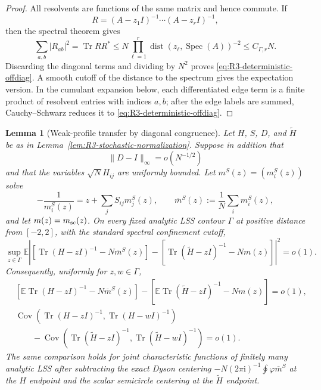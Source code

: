 \documentclass[11pt]{article}
\newtheorem{lemma}[theorem]{Lemma}
\theoremstyle{definition}
\theoremstyle{remark}
\newcommand{\E}{\mathbb E}
\newcommand{\Cov}{\operatorname{Cov}}
\newcommand{\Tr}{\operatorname{Tr}}
\newcommand{\spec}{\operatorname{Spec}}
\newcommand{\ii}{\mathrm i}
\newcommand{\norm}[1]{\lVert #1\rVert}
\begin{document}
\begin{proof}
All resolvents are functions of the same matrix and hence commute.  If
\[
 R=(A-z_1I)^{-1}\cdots(A-z_rI)^{-1},
\]
then the spectral theorem gives
\[
 \sum_{a,b}|R_{ab}|^2=\Tr RR^*
 \le N\prod_{\ell=1}^r
 \operatorname{dist}(z_\ell,\spec(A))^{-2}
 \le C_{\Gamma,r}N.
\]
Discarding the diagonal terms and dividing by \(N^2\) proves
\eqref{eq:R3-deterministic-offdiag}.  A smooth cutoff of the distance to the
spectrum gives the expectation version.  In the cumulant expansion below,
each differentiated edge term is a finite product of resolvent entries with
indices \(a,b\); after the edge labels are summed, Cauchy--Schwarz reduces it
to \eqref{eq:R3-deterministic-offdiag}.
\end{proof}

\begin{lemma}[Weak-profile transfer by diagonal congruence]
\label{lem:R3-profile-interpolation}
Let \(H\), \(S\), \(D\), and \(\widetilde H\) be as in
Lemma~\ref{lem:R3-stochastic-normalization}.  Suppose in addition that
\begin{equation}\label{eq:R3-congruence-rate}
 \norm{D-I}_\infty=o(N^{-1/2})
\end{equation}
and that the variables \(\sqrt N H_{ij}\) are uniformly bounded.  Let
\(m^S(z)=(m_i^S(z))\) solve
\begin{equation}\label{eq:R3-congruence-QVE}
 -\frac1{m_i^S(z)}=z+\sum_jS_{ij}m_j^S(z),
 \qquad
 \overline m^S(z):=\frac1N\sum_i m_i^S(z),
\end{equation}
and let \(m(z)=m_{\rm sc}(z)\).  On every fixed analytic LSS contour
\(\Gamma\) at positive distance from \([-2,2]\), with the standard spectral
confinement cutoff,
\begin{equation}\label{eq:R3-congruence-L2}
 \sup_{z\in\Gamma}\E\left|
 \left[\Tr(H-zI)^{-1}-N\overline m^S(z)\right]
 -\left[\Tr(\widetilde H-zI)^{-1}-Nm(z)\right]
 \right|^2=o(1).
\end{equation}
Consequently, uniformly for \(z,w\in\Gamma\),
\begin{align}
 &\left[\E\Tr(H-zI)^{-1}-N\overline m^S(z)\right]
 -\left[\E\Tr(\widetilde H-zI)^{-1}-Nm(z)\right]=o(1),
 \label{eq:R3-interpolation-bias}\\
 &\Cov\!\left(\Tr(H-zI)^{-1},\Tr(H-wI)^{-1}\right)
 \nonumber\\
 &\qquad-
 \Cov\!\left(\Tr(\widetilde H-zI)^{-1},
              \Tr(\widetilde H-wI)^{-1}\right)=o(1).
 \label{eq:R3-interpolation-cov}
\end{align}
The same comparison holds for joint characteristic functions of finitely many
analytic LSS after subtracting the exact Dyson centering
\(-N(2\pi\ii)^{-1}\oint\varphi\overline m^S\) at the \(H\) endpoint and the
scalar semicircle centering at the \(\widetilde H\) endpoint.
\end{lemma}
\end{document}
